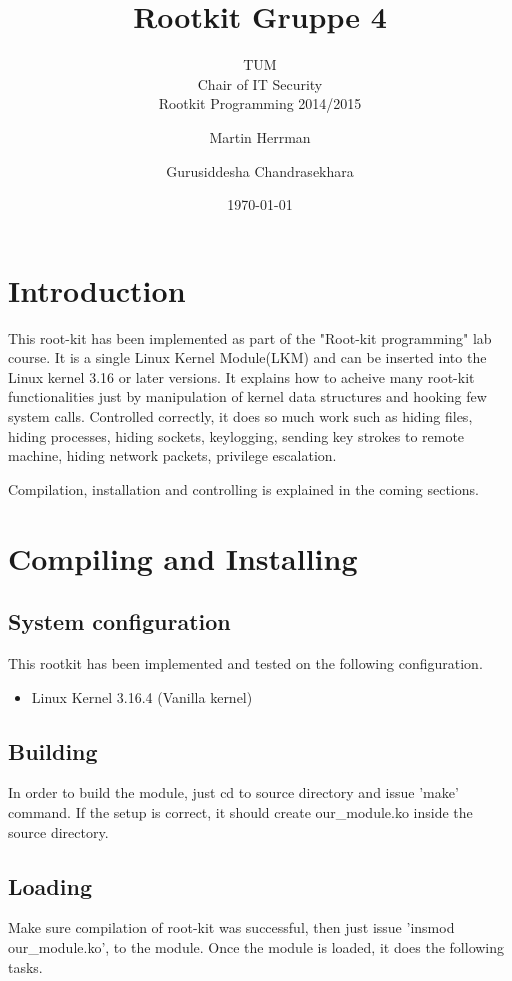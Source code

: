 \documentclass[10pt, letterpaper]{scrartcl}
\title{Rootkit Gruppe 4}
\subtitle{TUM \\Chair of IT Security\\  Rootkit Programming 2014/2015}
\author{Martin Herrman \and Gurusiddesha Chandrasekhara}
\date{\today}
\begin{document}
\maketitle
\tableofcontents
\newpage

\section{Introduction}
This root-kit has been implemented as part of the "Root-kit programming" lab course. 
It is a single Linux Kernel Module(LKM) and can be inserted into the Linux kernel 3.16 or later versions. 
It explains how to acheive many root-kit functionalities just by manipulation of kernel data structures and hooking few system calls. 
Controlled correctly, it does so much work such as hiding files, hiding processes, hiding sockets, keylogging, 
sending key strokes to remote machine, hiding network packets, privilege escalation.   

Compilation, installation and controlling is explained in the coming sections.

\section{Compiling and Installing}
\subsection{System configuration}
This rootkit has been implemented and tested on the following configuration.
\begin{itemize}
    \item Linux Kernel 3.16.4 (Vanilla kernel) 
\end{itemize}

\subsection{Building}
        In order to build the module, just cd to source directory and issue 'make' command. 
	If the setup is correct, it should create our\_module.ko inside the source directory. 

\subsection{Loading}
        Make sure compilation of root-kit was successful, then just issue 'insmod our\_module.ko', to the module. 
	Once the module is loaded, it does the following tasks. 
    
\end{document}
